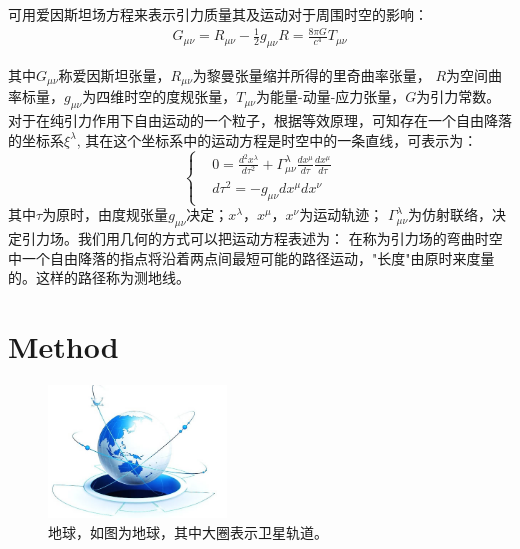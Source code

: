 \documentclass{ctexart}
\begin{document}
\par 可用爱因斯坦场方程来表示引力质量其及运动对于周围时空的影响：
\begin{equation}
  \begin{aligned}
  G_{\mu \nu} =R_{\mu \nu} -\frac{1}{2} g_{\mu \nu} R =\frac{8\pi G}{c^4} T_{\mu \nu}
  \end{aligned}
\end{equation}
\par 其中$G_{\mu \nu}$称爱因斯坦张量，$R_{\mu \nu}$为黎曼张量缩并所得的里奇曲率张量，
$R$为空间曲率标量，$g_{\mu \nu}$为四维时空的度规张量，$T_{\mu \nu}$为能量-动量-应力张量，$G$为引力常数。
	对于在纯引力作用下自由运动的一个粒子，根据等效原理，可知存在一个自由降落的坐标系$\xi^\lambda$,
其在这个坐标系中的运动方程是时空中的一条直线，可表示为：
\begin{equation}
    \left\{
    \begin{aligned}
    &0=\frac{d^2 x^\lambda}{d\tau ^2}+\Gamma^\lambda_{\mu \nu}\frac{dx^\mu}{d\tau}\frac{dx^\mu}{d\tau} \\
    &d\tau^2=-g_{\mu\nu}dx^\mu dx^\nu
    \end{aligned}
    \right.
\end{equation}
	其中$\tau$为原时，由度规张量$g_{\mu \nu}$决定；$x^\lambda$，$x^\mu$，$x^\nu$为运动轨迹；
$\Gamma_{\mu \nu}^\lambda$为仿射联络，决定引力场。我们用几何的方式可以把运动方程表述为：
在称为引力场的弯曲时空中一个自由降落的指点将沿着两点间最短可能的路径运动，"长度"由原时来度量的。这样的路径称为测地线。
\section{Method}

\begin{figure}
\small
\centering
\includegraphics[height=100pt]{Sphere.png}
\caption{地球，如图为地球，其中大圈表示卫星轨道。}
\label{3}
\end{figure}
\end{document}
